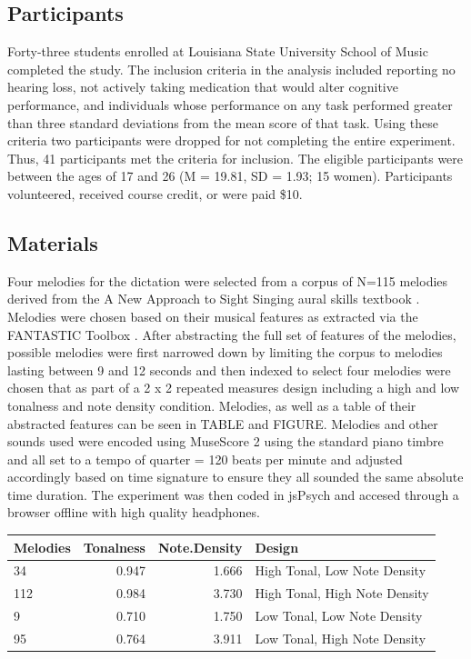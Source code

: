 \documentclass[]{book}
\begin{document}
\hypertarget{participants-1}{%
\subsection{Participants}\label{participants-1}}

Forty-three students enrolled at Louisiana State University School of Music completed the study.
The inclusion criteria in the analysis included reporting no hearing loss, not actively taking medication that would alter cognitive performance, and individuals whose performance on any task performed greater than three standard deviations from the mean score of that task.
Using these criteria two participants were dropped for not completing the entire experiment.
Thus, 41 participants met the criteria for inclusion.
The eligible participants were between the ages of 17 and 26 (M = 19.81, SD = 1.93; 15 women).
Participants volunteered, received course credit, or were paid \$10.

\hypertarget{materials-1}{%
\subsection{Materials}\label{materials-1}}

Four melodies for the dictation were selected from a corpus of N=115 melodies derived from the A New Approach to Sight Singing aural skills textbook \citep{berkowitzNewApproachSight2011}.
Melodies were chosen based on their musical features as extracted via the FANTASTIC Toolbox \citep{mullensiefenFantasticFeatureANalysis2009}.
After abstracting the full set of features of the melodies, possible melodies were first narrowed down by limiting the corpus to melodies lasting between 9 and 12 seconds and then indexed to select four melodies were chosen that as part of a 2 x 2 repeated measures design including a high and low tonalness and note density condition.
Melodies, as well as a table of their abstracted features can be seen in TABLE and FIGURE.
Melodies and other sounds used were encoded using MuseScore 2 using the standard piano timbre and all set to a tempo of quarter = 120 beats per minute and adjusted accordingly based on time signature to ensure they all sounded the same absolute time duration.
The experiment was then coded in jsPsych \citep{deleeuwJsPsychJavaScriptLibrary2015} and accesed through a browser offline with high quality headphones.

\begin{tabular}{l|r|r|l}
\hline
Melodies & Tonalness & Note.Density & Design\\
\hline
34 & 0.947 & 1.666 & High Tonal, Low Note Density\\
\hline
112 & 0.984 & 3.730 & High Tonal, High Note Density\\
\hline
9 & 0.710 & 1.750 & Low Tonal,  Low Note Density\\
\hline
95 & 0.764 & 3.911 & Low Tonal,  High Note Density\\
\hline
\end{tabular}
\end{document}
